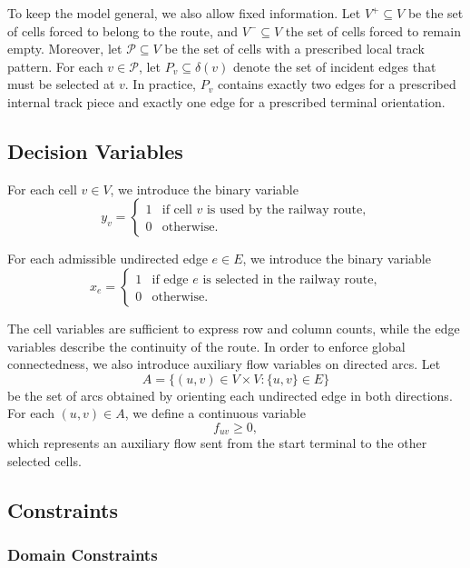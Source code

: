 To keep the model general, we also allow fixed information. Let \(V^{+} \subseteq V\) be the set of cells forced to belong to the route, and \(V^{-} \subseteq V\) the set of cells forced to remain empty. Moreover, let \(\mathcal{P} \subseteq V\) be the set of cells with a prescribed local track pattern. For each \(v \in \mathcal{P}\), let \(P_v \subseteq \delta(v)\) denote the set of incident edges that must be selected at \(v\). In practice, \(P_v\) contains exactly two edges for a prescribed internal track piece and exactly one edge for a prescribed terminal orientation.

\subsection{Decision Variables}

For each cell \(v \in V\), we introduce the binary variable
\[
    y_v =
    \begin{cases}
        1 & \text{if cell \(v\) is used by the railway route,}\\
        0 & \text{otherwise.}
    \end{cases}
\]

For each admissible undirected edge \(e \in E\), we introduce the binary variable
\[
    x_e =
    \begin{cases}
        1 & \text{if edge \(e\) is selected in the railway route,}\\
        0 & \text{otherwise.}
    \end{cases}
\]

The cell variables are sufficient to express row and column counts, while the edge variables describe the continuity of the route. In order to enforce global connectedness, we also introduce auxiliary flow variables on directed arcs. Let
\[
    A = \{(u,v) \in V \times V : \{u,v\} \in E\}
\]
be the set of arcs obtained by orienting each undirected edge in both directions. For each \((u,v) \in A\), we define a continuous variable
\[
    f_{uv} \geq 0,
\]
which represents an auxiliary flow sent from the start terminal to the other selected cells.

\subsection{Constraints}

\subsubsection{Domain Constraints}

